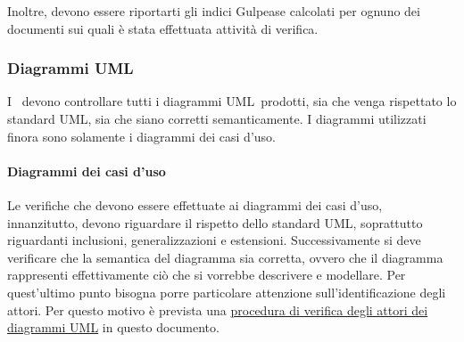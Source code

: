 \documentclass[../NormeProgetto.text]{subfiles}
\begin{document}
			Inoltre, devono essere riportarti gli indici Gulpease calcolati per ognuno dei documenti sui quali è stata effettuata attività di verifica.
	\subsubsection{Diagrammi UML}
		I \verificatori\ devono controllare tutti i diagrammi UML\g\ prodotti, sia che venga rispettato lo standard UML\g, sia che siano corretti semanticamente. I diagrammi utilizzati finora sono solamente i diagrammi dei casi d'uso.
			\paragraph{Diagrammi dei casi d'uso}
				Le verifiche che devono essere effettuate ai diagrammi dei casi d'uso, innanzitutto, devono riguardare il rispetto dello standard UML\g, soprattutto riguardanti inclusioni, generalizzazioni e estensioni. Successivamente si deve verificare che la semantica del diagramma sia corretta, ovvero che il diagramma rappresenti effettivamente ciò che si vorrebbe descrivere e modellare. Per quest'ultimo punto bisogna porre particolare attenzione sull'identificazione degli attori. Per questo motivo è prevista una \hyperref[par:Procedura di verifica degli attori dei diagrammi UML]{procedura di verifica degli attori dei diagrammi UML} in questo documento.\\ 
\end{document}
